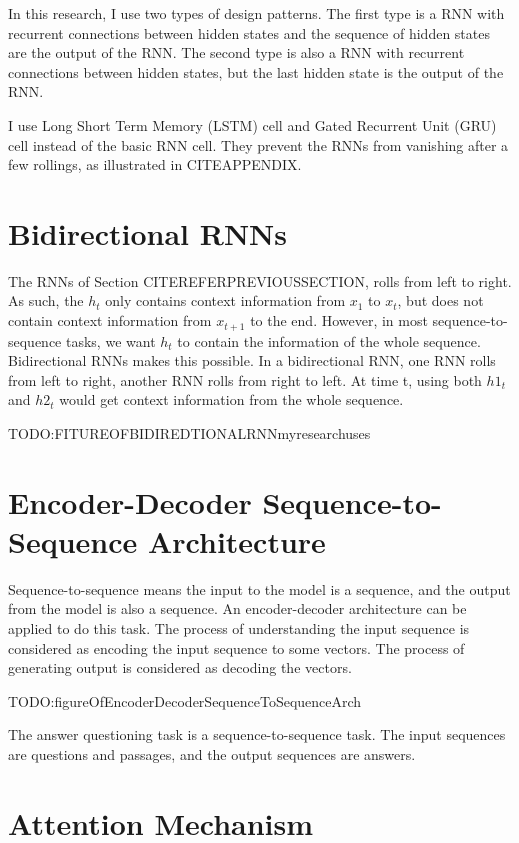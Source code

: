 \documentclass[modernstyle,12pt]{sjsuthesis}
\theoremstyle{definition}
\begin{document}
In this research, I use two types of design patterns. The first type is a RNN with recurrent connections between hidden states and the sequence of hidden states are the output of the RNN. The second type is also a RNN with recurrent connections between hidden states, but the last hidden state is the output of the RNN.

I use Long Short Term Memory (LSTM) cell and Gated Recurrent Unit (GRU) cell instead of the basic RNN cell. They prevent the RNNs from vanishing after a few rollings, as illustrated in CITEAPPENDIX.
\section{Bidirectional RNNs}

The RNNs of Section CITEREFERPREVIOUSSECTION, rolls from left to right. As such, the $h_t$ only contains context information from $x_1$ to $x_t$, but does not contain context information from $x_{t+1}$ to the end. However, in most sequence-to-sequence tasks, we want $h_t$ to contain the information of the whole sequence. Bidirectional RNNs makes this possible. In a bidirectional RNN, one RNN rolls from left to right, another RNN rolls from right to left. At time t, using both $h1_t$ and $h2_t$ would get context information from the whole sequence.

TODO:FITUREOFBIDIREDTIONALRNNmyresearchuses

\section{Encoder-Decoder Sequence-to-Sequence Architecture}

Sequence-to-sequence means the input to the model is a sequence, and the output from the model is also a sequence. An encoder-decoder architecture can be applied to do this task. The process of understanding the input sequence is considered as encoding the input sequence to some vectors. The process of generating output is considered as decoding the vectors.

TODO:figureOfEncoderDecoderSequenceToSequenceArch

The answer questioning task is a sequence-to-sequence task. The input sequences are questions and passages, and the output sequences are answers.

\section{Attention Mechanism}
\end{document}
